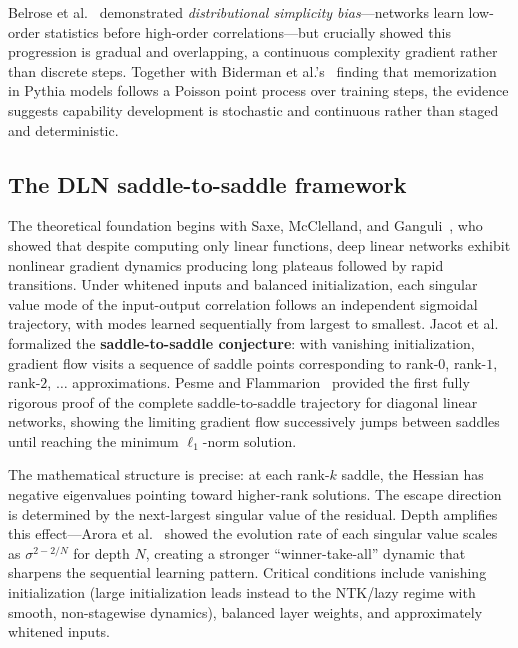 \documentclass{article}
\theoremstyle{definition}
\begin{document}
Belrose et al.~\cite{belrose2024neural} demonstrated \emph{distributional simplicity bias}---networks learn low-order statistics before high-order correlations---but crucially showed this progression is gradual and overlapping, a continuous complexity gradient rather than discrete steps. Together with Biderman et al.'s~\cite{biderman2023pythia} finding that memorization in Pythia models follows a Poisson point process over training steps, the evidence suggests capability development is stochastic and continuous rather than staged and deterministic.

\subsection{The DLN saddle-to-saddle framework}

The theoretical foundation begins with Saxe, McClelland, and Ganguli~\cite{saxe2014exact}, who showed that despite computing only linear functions, deep linear networks exhibit nonlinear gradient dynamics producing long plateaus followed by rapid transitions. Under whitened inputs and balanced initialization, each singular value mode of the input-output correlation follows an independent sigmoidal trajectory, with modes learned sequentially from largest to smallest. Jacot et al.~\cite{jacot2022saddle} formalized the \textbf{saddle-to-saddle conjecture}: with vanishing initialization, gradient flow visits a sequence of saddle points corresponding to rank-$0$, rank-$1$, rank-$2$, $\ldots$ approximations. Pesme and Flammarion~\cite{pesme2023saddle} provided the first fully rigorous proof of the complete saddle-to-saddle trajectory for diagonal linear networks, showing the limiting gradient flow successively jumps between saddles until reaching the minimum $\ell_1$-norm solution.

The mathematical structure is precise: at each rank-$k$ saddle, the Hessian has negative eigenvalues pointing toward higher-rank solutions. The escape direction is determined by the next-largest singular value of the residual. Depth amplifies this effect---Arora et al.~\cite{arora2019implicit} showed the evolution rate of each singular value scales as $\sigma^{2-2/N}$ for depth $N$, creating a stronger ``winner-take-all'' dynamic that sharpens the sequential learning pattern. Critical conditions include vanishing initialization (large initialization leads instead to the NTK/lazy regime with smooth, non-stagewise dynamics), balanced layer weights, and approximately whitened inputs.
\end{document}
